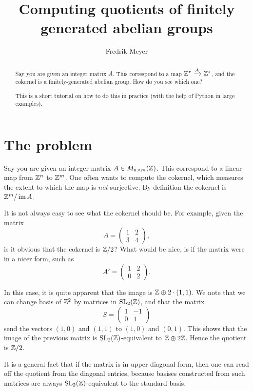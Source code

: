 \documentclass[11pt, english]{article}
\begin{document}
\title{Computing quotients of finitely generated abelian groups}
\author{Fredrik Meyer}
\maketitle 

\begin{abstract}

Say you are given an integer matrix $A$. This correspond to a map $\mathbb{Z}^r \xrightarrow A \mathbb{Z}^s$, and the cokernel is a finitely-generated abelian group. How do you see which one?

This is a short tutorial on how to do this in practice (with the help of Python in large examples).
\end{abstract}

\section{The problem}

Say you are given an integer matrix $A \in M_{n \times m}(\mathbb{Z})$. This correspond to a linear map from $\mathbb{Z}^n$ to $\mathbb{Z}^m$. One often wants to compute the cokernel, which measures the extent to which the map is \emph{not} surjective. By definition the cokernel is $\mathbb{Z}^m/\operatorname{im} A$. 

It is not always easy to see what the cokernel should be. For example, given the matrix
$$
A =
\begin{pmatrix}
1 & 2 \\ 3 & 4
\end{pmatrix},
$$
is it obvious that the cokernel is $\mathbb{Z}/2$? What would be nice, is if the matrix were in a nicer form, such as 
$$A ' = 
\begin{pmatrix}
1 & 2 \\ 0 & 2
\end{pmatrix}.
$$

In this case, it is quite apparent that the image is $\mathbb{Z} \oplus 2\cdot (1,1)$. We note that we can change basis of $\mathbb{Z}^2$ by matrices in $\operatorname{SL}_2(\mathbb{Z})$, and that the matrix
$$
S = 
\begin{pmatrix}
1 & -1 \\ 0 & 1
\end{pmatrix}
$$
send the vectors $(1,0)$ and $(1,1)$ to $(1,0)$ and $(0,1)$. This shows that the image of the previous matrix is $\operatorname{SL}_2(\mathbb{Z})$-equivalent to $\mathbb{Z} \oplus 2 \mathbb{Z}$. Hence the quotient is $\mathbb{Z}/2$. 

It is a general fact that if the matrix is in upper diagonal form, then one can read off the quotient from the diagonal entries, because basises constructed from such matrices are always $\operatorname{SL}_2(\mathbb{Z})$-equivalent to the standard basis.
\end{document}
